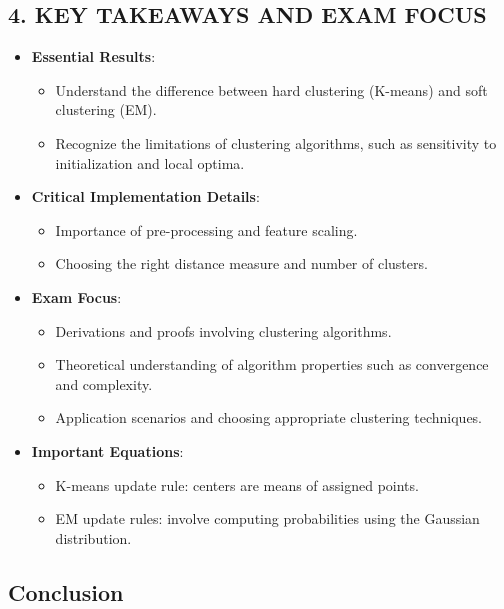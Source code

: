 \documentclass[
  12pt,
]{report}
\providecommand{\tightlist}{%
  \setlength{\itemsep}{0pt}\setlength{\parskip}{0pt}}
\begin{document}
\subsection{4. KEY TAKEAWAYS AND EXAM FOCUS}\label{key-takeaways-and-exam-focus-1}

\begin{itemize}
\tightlist
\item
  \textbf{Essential Results}:

  \begin{itemize}
  \tightlist
  \item
    Understand the difference between hard clustering (K-means) and soft clustering (EM).
  \item
    Recognize the limitations of clustering algorithms, such as sensitivity to initialization and local optima.
  \end{itemize}
\item
  \textbf{Critical Implementation Details}:

  \begin{itemize}
  \tightlist
  \item
    Importance of pre-processing and feature scaling.
  \item
    Choosing the right distance measure and number of clusters.
  \end{itemize}
\item
  \textbf{Exam Focus}:

  \begin{itemize}
  \tightlist
  \item
    Derivations and proofs involving clustering algorithms.
  \item
    Theoretical understanding of algorithm properties such as convergence and complexity.
  \item
    Application scenarios and choosing appropriate clustering techniques.
  \end{itemize}
\item
  \textbf{Important Equations}:

  \begin{itemize}
  \tightlist
  \item
    K-means update rule: centers are means of assigned points.
  \item
    EM update rules: involve computing probabilities using the Gaussian distribution.
  \end{itemize}
\end{itemize}

\subsection{Conclusion}\label{conclusion}
\end{document}

